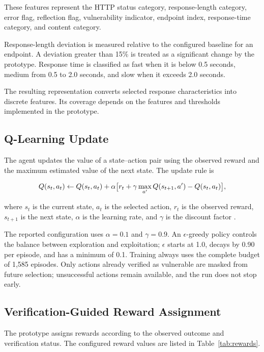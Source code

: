 \documentclass[conference]{IEEEtran}
\begin{document}
These features represent the HTTP status category,
response-length category, error flag, reflection flag,
vulnerability indicator, endpoint index, response-time
category, and content category.

Response-length deviation is measured relative to the
configured baseline for an endpoint. A deviation greater
than 15\% is treated as a significant change by the
prototype. Response time is classified as fast when it
is below 0.5 seconds, medium from 0.5 to 2.0 seconds,
and slow when it exceeds 2.0 seconds.

The resulting representation converts selected response
characteristics into discrete features. Its coverage
depends on the features and thresholds implemented in
the prototype.

\subsection{Q-Learning Update}

The agent updates the value of a state--action pair using
the observed reward and the maximum estimated value of
the next state. The update rule is

\begin{equation}
\footnotesize
Q(s_t,a_t) \leftarrow Q(s_t,a_t) + \alpha \big[ r_t + \gamma \max_{a'} Q(s_{t+1},a') - Q(s_t,a_t) \big],
\label{eq:ql}
\end{equation}

where $s_t$ is the current state, $a_t$ is the selected
action, $r_t$ is the observed reward, $s_{t+1}$ is the
next state, $\alpha$ is the learning rate, and $\gamma$
is the discount factor \cite{sutton2018}.

The reported configuration uses $\alpha=0.1$ and
$\gamma=0.9$. An $\epsilon$-greedy policy controls the
balance between exploration and exploitation; $\epsilon$
starts at 1.0, decays by 0.90 per episode, and has a minimum
of 0.1.
Training always uses the complete budget of 1,585 episodes.
Only actions already verified as vulnerable are masked from
future selection; unsuccessful actions remain available, and
the run does not stop early.

\subsection{Verification-Guided Reward Assignment}

The prototype assigns rewards according to the observed
outcome and verification status. The configured reward
values are listed in Table~\ref{tab:rewards}.
\end{document}
